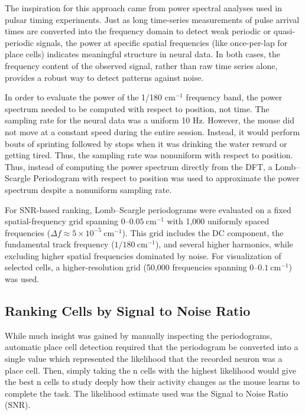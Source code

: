 \documentclass[preprint]{aastex701}
\begin{document}
The inspiration for this approach came from power spectral analyses used in pulsar timing experiments.  Just as long time-series measurements of pulse arrival times are converted into the frequency domain to detect weak periodic or quasi-periodic signals,\citep{arzoumanian2018nanograv11yr} the power at specific spatial frequencies (like once-per-lap for place cells) indicates meaningful structure in neural data. In both cases, the frequency content of the observed signal, rather than raw time series alone, provides a robust way to detect patterns against noise. 

In order to evaluate the power of the 1/180 cm$^{-1}$ frequency band, the power spectrum needed to be computed with respect to position, not time. The sampling rate for the neural data was a uniform 10 Hz. However, the mouse did not move at a constant speed during the entire session. Instead, it would perform bouts of sprinting followed by stops when it was drinking the water reward or getting tired. Thus, the sampling rate was nonuniform with respect to position. Thus, instead of computing the power spectrum directly from the DFT, a Lomb--Scargle Periodogram with respect to position was used to approximate the power spectrum despite a nonuniform sampling rate. 

For SNR-based ranking, Lomb--Scargle periodograms were evaluated on a fixed spatial-frequency grid spanning
$0$--$0.05~\mathrm{cm}^{-1}$ with 1{,}000 uniformly spaced frequencies
($\Delta f \approx 5 \times 10^{-5}~\mathrm{cm}^{-1}$).
This grid includes the DC component, the fundamental track frequency
($1/180~\mathrm{cm}^{-1}$), and several higher harmonics, while excluding higher
spatial frequencies dominated by noise.
For visualization of selected cells, a higher-resolution grid
(50{,}000 frequencies spanning $0$--$0.1~\mathrm{cm}^{-1}$) was used.


\subsection{Ranking Cells by Signal to Noise Ratio}

While much insight was gained by manually inspecting the periodograms, automatic place cell detection required that the periodogram be converted into a single value which represented the likelihood that the recorded neuron was a place cell. Then, simply taking the n cells with the highest likelihood would give the best n cells to study deeply how their activity changes as the mouse learns to complete the task. The likelihood estimate used was the Signal to Noise Ratio (SNR).
\end{document}
